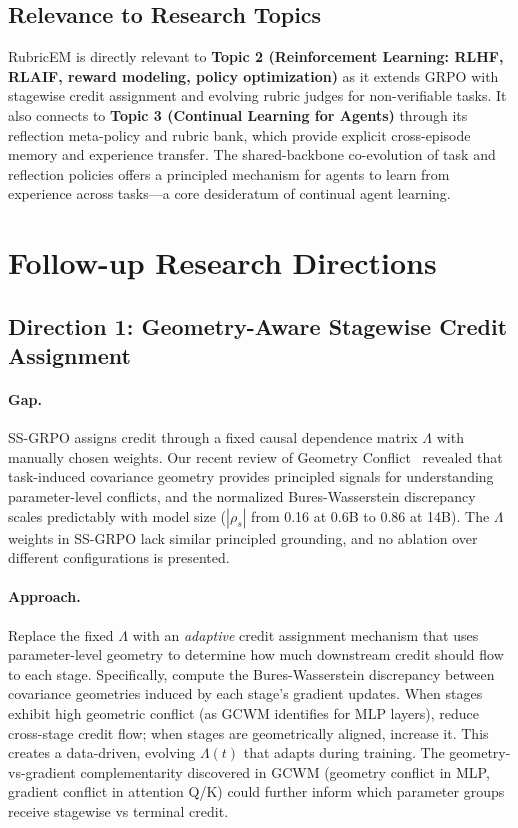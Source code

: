 \documentclass[11pt,a4paper]{article}
\begin{document}
\subsection{Relevance to Research Topics}

RubricEM is directly relevant to \textbf{Topic 2 (Reinforcement Learning: RLHF, RLAIF, reward modeling, policy optimization)} as it extends GRPO with stagewise credit assignment and evolving rubric judges for non-verifiable tasks. It also connects to \textbf{Topic 3 (Continual Learning for Agents)} through its reflection meta-policy and rubric bank, which provide explicit cross-episode memory and experience transfer. The shared-backbone co-evolution of task and reflection policies offers a principled mechanism for agents to learn from experience across tasks---a core desideratum of continual agent learning.

\section{Follow-up Research Directions}

\subsection{Direction 1: Geometry-Aware Stagewise Credit Assignment}

\paragraph{Gap.} SS-GRPO assigns credit through a fixed causal dependence matrix $\Lambda$ with manually chosen weights. Our recent review of Geometry Conflict~\cite{geometryconflict} revealed that task-induced covariance geometry provides principled signals for understanding parameter-level conflicts, and the normalized Bures-Wasserstein discrepancy scales predictably with model size ($|\rho_s|$ from 0.16 at 0.6B to 0.86 at 14B). The $\Lambda$ weights in SS-GRPO lack similar principled grounding, and no ablation over different configurations is presented.

\paragraph{Approach.} Replace the fixed $\Lambda$ with an \textit{adaptive} credit assignment mechanism that uses parameter-level geometry to determine how much downstream credit should flow to each stage. Specifically, compute the Bures-Wasserstein discrepancy between covariance geometries induced by each stage's gradient updates. When stages exhibit high geometric conflict (as GCWM identifies for MLP layers), reduce cross-stage credit flow; when stages are geometrically aligned, increase it. This creates a data-driven, evolving $\Lambda(t)$ that adapts during training. The geometry-vs-gradient complementarity discovered in GCWM (geometry conflict in MLP, gradient conflict in attention Q/K) could further inform which parameter groups receive stagewise vs terminal credit.
\end{document}
